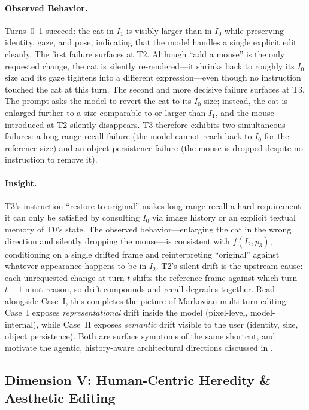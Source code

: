 \paragraph{Observed Behavior.}
Turns~0--1 succeed: the cat in $I_1$ is visibly larger than in $I_0$ while preserving identity, gaze, and pose, indicating that the model handles a single explicit edit cleanly. The first failure surfaces at T2. Although ``add a mouse'' is the only requested change, the cat is silently re-rendered---it shrinks back to roughly its $I_0$ size and its gaze tightens into a different expression---even though no instruction touched the cat at this turn. The second and more decisive failure surfaces at T3. The prompt asks the model to revert the cat to its $I_0$ size; instead, the cat is enlarged further to a size comparable to or larger than $I_1$, and the mouse introduced at T2 silently disappears. T3 therefore exhibits two simultaneous failures: a long-range recall failure (the model cannot reach back to $I_0$ for the reference size) and an object-persistence failure (the mouse is dropped despite no instruction to remove it).

\paragraph{Insight.}
T3's instruction ``restore to original'' makes long-range recall a hard requirement: it can only be satisfied by consulting $I_0$ via image history or an explicit textual memory of T0's state. The observed behavior---enlarging the cat in the wrong direction and silently dropping the mouse---is consistent with $f(I_2, p_3)$, conditioning on a single drifted frame and reinterpreting ``original'' against whatever appearance happens to be in $I_2$. T2's silent drift is the upstream cause: each unrequested change at turn $t$ shifts the reference frame against which turn $t{+}1$ must reason, so drift compounds and recall degrades together. Read alongside Case~I, this completes the picture of Markovian multi-turn editing: Case~I exposes \emph{representational} drift inside the model (pixel-level, model-internal), while Case~II exposes \emph{semantic} drift visible to the user (identity, size, object persistence). Both are surface symptoms of the same shortcut, and motivate the agentic, history-aware architectural directions discussed in .

\endgroup


\subsection{Dimension V: Human-Centric Heredity \& Aesthetic Editing}

